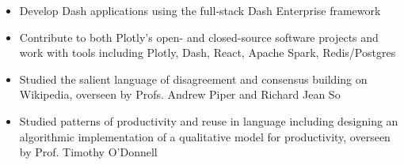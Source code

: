 \documentclass[10pt,ragged2e]{altacv}
\begin{document}
\divider

\begin{itemize}
\item Develop Dash applications using the full-stack Dash Enterprise framework
\item Contribute to both Plotly’s open- and closed-source software projects and work with tools including Plotly, Dash, React, Apache Spark, Redis/Postgres
\end{itemize}

\begin{itemize}
\item Studied the salient language of disagreement and consensus building on Wikipedia, overseen by Profs. Andrew Piper and Richard Jean So
\end{itemize}

\divider

\begin{itemize}
\item Studied patterns of productivity and reuse in language including designing an algorithmic implementation of a qualitative model for productivity, overseen by Prof. Timothy O'Donnell
\end{itemize}


\clearpage
\end{document}
